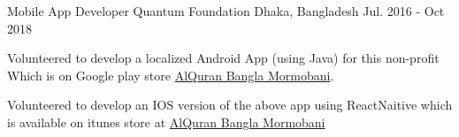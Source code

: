 

\begin{cventries}

  \cventry
    {Mobile App Developer} %
    {Quantum Foundation} %
    {Dhaka, Bangladesh} %
    {Jul. 2016 - Oct 2018} %
    {
      \begin{cvitems} %
        \item {Volunteered to develop a localized Android App (using Java) for this non-profit Which is on Google play store \href{https://play.google.com/store/apps/details?id=quantum.org.quran}{\color{blue}AlQuran Bangla Mormobani}.}
        \item {Volunteered to develop an IOS version of the above app using ReactNaitive which is available on itunes store at \href{https://itunes.apple.com/us/app/al-quran-bangla-mormobani/id1229434136?mt=8}{\color{blue}AlQuran Bangla Mormobani}}
      \end{cvitems}
    }

\end{cventries}
